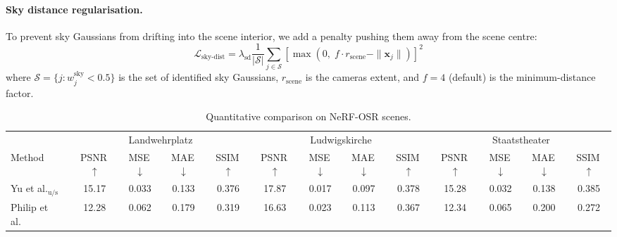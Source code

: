 \documentclass[conference]{IEEEtran}
\begin{document}
\paragraph{Sky distance regularisation.}
To prevent sky Gaussians from drifting into the scene interior, we add a penalty pushing them away from the scene centre:
\begin{equation}
    \mathcal{L}_{\text{sky-dist}} = \lambda_{\text{sd}} \frac{1}{|\mathcal{S}|}\sum_{j \in \mathcal{S}} \left[\max(0,\; f \cdot r_{\text{scene}} - \|\mathbf{x}_j\|)\right]^2
    \label{eq:sky_dist}
\end{equation}
where $\mathcal{S} = \{j : w_j^{\text{sky}} < 0.5\}$ is the set of identified sky Gaussians, $r_{\text{scene}}$ is the cameras extent, and $f = 4$ (default) is the minimum-distance factor.

\begin{table}[!tb]
    \centering
    \caption{Quantitative comparison on NeRF-OSR scenes.}
    \label{tab:nvs}
    \setlength{\tabcolsep}{3pt}
    \small
    \begin{tabular}{l cccc cccc cccc}
        \toprule
                                                      & \multicolumn{4}{c}{Landwehrplatz} & \multicolumn{4}{c}{Ludwigskirche} & \multicolumn{4}{c}{Staatstheater}                                                                                    \\
        \cmidrule(lr){2-5} \cmidrule(lr){6-9} \cmidrule(lr){10-13}
        Method                                        & PSNR\,$\uparrow$                  & MSE\,$\downarrow$                 & MAE\,$\downarrow$                 & SSIM\,$\uparrow$
                                                      & PSNR\,$\uparrow$                  & MSE\,$\downarrow$                 & MAE\,$\downarrow$                 & SSIM\,$\uparrow$
                                                      & PSNR\,$\uparrow$                  & MSE\,$\downarrow$                 & MAE\,$\downarrow$                 & SSIM\,$\uparrow$                                                                 \\
        \midrule
        Yu et al.$_{\text{u/s}}$~\cite{yu2021outdoor} & 15.17                             & 0.033                             & 0.133                             & 0.376            & 17.87 & 0.017 & 0.097 & 0.378 & 15.28 & 0.032 & 0.138 & 0.385 \\
        Philip et al.~\cite{philip2019multiview}      & 12.28                             & 0.062                             & 0.179                             & 0.319            & 16.63 & 0.023 & 0.113 & 0.367 & 12.34 & 0.065 & 0.200 & 0.272 \\

\end{tabular}
\end{table}
\end{document}
